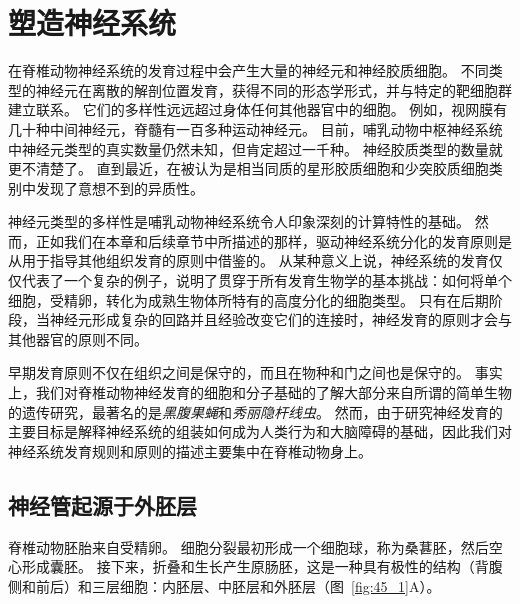 \chapter{塑造神经系统} \label{chap:chap45}

在脊椎动物神经系统的发育过程中会产生大量的神经元和神经胶质细胞。
不同类型的神经元在离散的解剖位置发育，获得不同的形态学形式，并与特定的靶细胞群建立联系。
它们的多样性远远超过身体任何其他器官中的细胞。
例如，视网膜有几十种中间神经元，脊髓有一百多种运动神经元。
目前，哺乳动物中枢神经系统中神经元类型的真实数量仍然未知，但肯定超过一千种。
神经胶质类型的数量就更不清楚了。
直到最近，在被认为是相当同质的星形胶质细胞和少突胶质细胞类别中发现了意想不到的异质性。


神经元类型的多样性是哺乳动物神经系统令人印象深刻的计算特性的基础。
然而，正如我们在本章和后续章节中所描述的那样，驱动神经系统分化的发育原则是从用于指导其他组织发育的原则中借鉴的。
从某种意义上说，神经系统的发育仅仅代表了一个复杂的例子，说明了贯穿于所有发育生物学的基本挑战：如何将单个细胞，受精卵，转化为成熟生物体所特有的高度分化的细胞类型。
只有在后期阶段，当神经元形成复杂的回路并且经验改变它们的连接时，神经发育的原则才会与其他器官的原则不同。


早期发育原则不仅在组织之间是保守的，而且在物种和门之间也是保守的。
事实上，我们对脊椎动物神经发育的细胞和分子基础的了解大部分来自所谓的简单生物的遗传研究，最著名的是\textit{黑腹果蝇}和\textit{秀丽隐杆线虫}。
然而，由于研究神经发育的主要目标是解释神经系统的组装如何成为人类行为和大脑障碍的基础，因此我们对神经系统发育规则和原则的描述主要集中在脊椎动物身上。



\section{神经管起源于外胚层}

脊椎动物胚胎来自受精卵。
细胞分裂最初形成一个细胞球，称为桑葚胚，然后空心形成囊胚。
接下来，折叠和生长产生原肠胚，这是一种具有极性的结构（背腹侧和前后）和三层细胞：内胚层、中胚层和外胚层（图~\ref{fig:45_1}A）。


